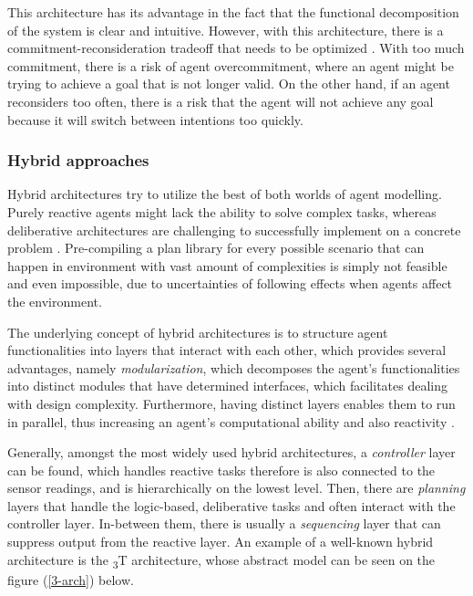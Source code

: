 \documentclass[main.tex]{subfiles}
\begin{document}
This architecture has its advantage in the fact that the functional decomposition of the system
is clear and intuitive. However, with this architecture, there is a commitment-reconsideration
tradeoff that needs to be optimized \cite{Wooldridge1999}. With too much commitment, there is a
risk of agent overcommitment, where an agent might be trying to achieve a goal that is not
longer valid. On the other hand, if an agent reconsiders too often, there is a risk that the
agent will not achieve any goal because it will switch between intentions too quickly.

\subsubsection{Hybrid approaches}

Hybrid architectures try to utilize the best of both worlds of agent modelling. Purely reactive 
agents might lack the ability to solve complex tasks, whereas deliberative architectures are 
challenging to successfully implement on a concrete problem \cite{Anthony2014}. Pre-compiling a plan
library for every possible scenario that can happen in environment with vast amount of complexities
is simply not feasible and even impossible, due to uncertainties of following effects when agents 
affect the environment. 

The underlying concept of hybrid architectures is to structure agent functionalities into layers 
that interact with each other, which provides several advantages, namely \emph{modularization},
which decomposes the agent's functionalities into distinct modules that have determined 
interfaces, which facilitates dealing with design complexity. Furthermore, having distinct layers enables 
them to run in parallel, thus increasing an agent's computational ability and also reactivity
\cite{Mueller1999}.

Generally, amongst the most widely used hybrid architectures, a \emph{controller} layer can be
found, which handles reactive tasks therefore is also connected to the sensor readings, and is 
hierarchically on the lowest level. Then, there are \emph{planning} layers that handle the
logic-based, deliberative tasks and often interact with the controller layer. In-between them, 
there is usually a \emph{sequencing} layer that can suppress output from the reactive layer. 
An example of a well-known hybrid architecture is the \textsubscript{3}T architecture, whose 
abstract model can be seen on the figure (\ref{3-arch}) below.
\end{document}
